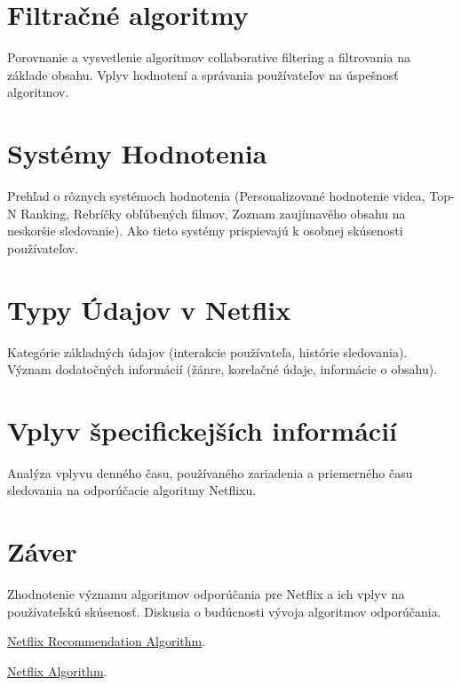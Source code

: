 \documentclass[10pt,twocolumn,twoside,slovak,a4paper]{article}
\begin{document}
\section{Filtračné algoritmy}
Porovnanie a vysvetlenie algoritmov collaborative filtering a filtrovania na základe obsahu.
Vplyv hodnotení a správania používateľov na úspešnosť algoritmov.

\section{Systémy Hodnotenia}
Prehľad o rôznych systémoch hodnotenia (Personalizované hodnotenie videa, Top-N Ranking, Rebríčky obľúbených filmov, Zoznam zaujímavého obsahu na neskoršie sledovanie).
Ako tieto systémy prispievajú k osobnej skúsenosti používateľov.

\section{Typy Údajov v Netflix}
Kategórie základných údajov (interakcie používateľa, histórie sledovania).
Význam dodatočných informácií (žánre, korelačné údaje, informácie o obsahu).

\section{Vplyv špecifickejších informácií}
Analýza vplyvu denného času, používaného zariadenia a priemerného času sledovania na odporúčacie algoritmy Netflixu.

\section{Záver}
Zhodnotenie významu algoritmov odporúčania pre Netflix a ich vplyv na používateľskú skúsenosť.
Diskusia o budúcnosti vývoja algoritmov odporúčania.
\begin{thebibliography}{9}

\href{https://stratoflow.com/how-netflix-recommendation-algorithm-work/}{Netflix Recommendation Algorithm}.  

\href{https://recostream.com/blog/recommendation-system-netflix}{Netflix Algorithm}.  

\end{thebibliography}
\end{document}
